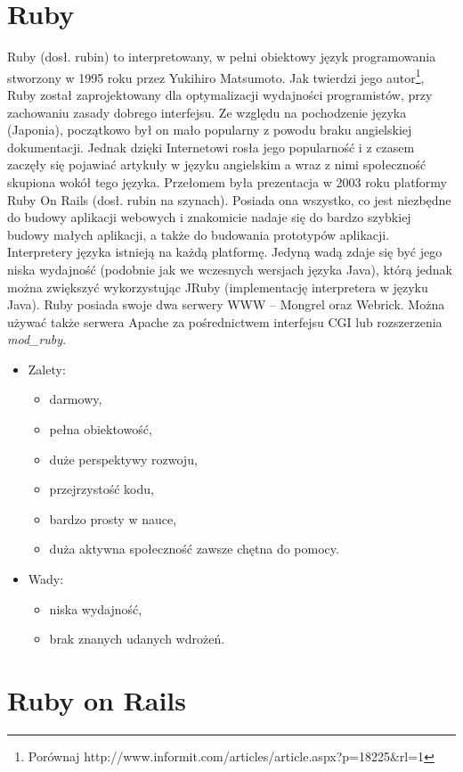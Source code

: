 \documentclass[a4paper,12pt,oneside]{report}
\begin{document}
\section{Ruby}
\label{sec:ror}
Ruby (dosł. rubin) to interpretowany, w pełni obiektowy język programowania stworzony w 1995 roku przez Yukihiro Matsumoto. Jak twierdzi jego autor\footnote{Porównaj http://www.informit.com/articles/article.aspx?p=18225\&rl=1}, Ruby został zaprojektowany dla optymalizacji wydajności programistów, przy zachowaniu zasady dobrego interfejsu. Ze względu na pochodzenie języka (Japonia), początkowo był on mało popularny z powodu braku angielskiej dokumentacji. Jednak dzięki Internetowi rosła jego popularność i z czasem zaczęły się pojawiać artykuły w języku angielskim a wraz z nimi społeczność skupiona wokół tego języka. Przełomem była prezentacja w 2003 roku platformy Ruby On Rails (dosł. rubin na szynach). Posiada ona wszystko, co jest niezbędne do budowy aplikacji webowych i znakomicie nadaje się do bardzo szybkiej budowy małych aplikacji, a także do budowania prototypów aplikacji. Interpretery języka istnieją na każdą platformę. Jedyną wadą zdaje się być jego niska wydajność (podobnie jak we wczesnych wersjach języka Java), którą jednak można zwiększyć wykorzystując JRuby (implementację interpretera w języku Java). Ruby posiada swoje dwa serwery WWW -- Mongrel oraz Webrick. Można używać także serwera Apache za pośrednictwem interfejsu CGI lub rozszerzenia \emph{mod\_ruby}.

\begin{itemize}
\item Zalety:
  \begin{itemize}
  \item darmowy,
  \item pełna obiektowość,
  \item duże perspektywy rozwoju, 
  \item przejrzystość kodu, 
  \item bardzo prosty w nauce,
  \item duża aktywna społeczność zawsze chętna do pomocy.
  \end{itemize}
\item Wady:
  \begin{itemize}
  \item niska wydajność,
  \item brak znanych udanych wdrożeń.
  \end{itemize}
\end{itemize}

\section{Ruby on Rails}
\label{sec:ror}
\end{document}
